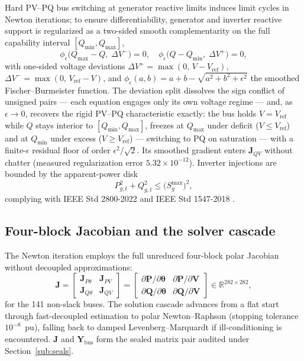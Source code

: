 Hard PV--PQ bus switching at generator reactive limits induces limit cycles in Newton iterations; to ensure differentiability, generator and inverter reactive support is regularized as a two-sided smooth complementarity on the full capability interval $[Q_{\min}, Q_{\max}]$,
\begin{equation}
\phi_\epsilon\bigl(Q_{\max} - Q,\; \Delta V^{-}\bigr) = 0, \quad
\phi_\epsilon\bigl(Q - Q_{\min},\; \Delta V^{+}\bigr) = 0,
\label{eq:qsgen}
\end{equation}
with one-sided voltage deviations $\Delta V^{+} = \max(0,\, V - V_{\mathrm{ref}})$, $\Delta V^{-} = \max(0,\, V_{\mathrm{ref}} - V)$, and $\phi_\epsilon(a, b) = a + b - \sqrt{a^2 + b^2 + \epsilon^2}$ the smoothed Fischer--Burmeister function. The deviation split dissolves the sign conflict of unsigned pairs --- each equation engages only its own voltage regime --- and, as $\epsilon \to 0$, recovers the rigid PV--PQ characteristic exactly: the bus holds $V = V_{\mathrm{ref}}$ while $Q$ stays interior to $[Q_{\min}, Q_{\max}]$, freezes at $Q_{\max}$ under deficit ($V \le V_{\mathrm{ref}}$) and at $Q_{\min}$ under excess ($V \ge V_{\mathrm{ref}}$) --- switching to PQ on saturation --- with a finite-$\epsilon$ residual floor of order $\epsilon^2/\sqrt{2}$. Its smoothed gradient enters $\mathbf{J}_{QV}$ without chatter (measured regularization error $5.32 \times 10^{-12}$). Inverter injections are bounded by the apparent-power disk
\begin{equation}
P_{g,t}^{2} + Q_{g,t}^{2} \le \bigl(S_{g}^{\max}\bigr)^{2},
\label{eq:capability}
\end{equation}
complying with IEEE Std 2800-2022 \cite{ieee2800} and IEEE Std 1547-2018 \cite{ieee1547}.

\subsection{Four-block Jacobian and the solver cascade}
\label{sub:jacobian}

The Newton iteration employs the full unreduced four-block polar Jacobian without decoupled approximations:
\begin{equation}
\mathbf{J} =
\begin{bmatrix}
\mathbf{J}_{P\theta} & \mathbf{J}_{PV} \\
\mathbf{J}_{Q\theta} & \mathbf{J}_{QV}
\end{bmatrix}
=
\begin{bmatrix}
\partial \mathbf{P} / \partial \boldsymbol{\theta} & \partial \mathbf{P} / \partial \mathbf{V} \\[3pt]
\partial \mathbf{Q} / \partial \boldsymbol{\theta} & \partial \mathbf{Q} / \partial \mathbf{V}
\end{bmatrix} \in \mathbb{R}^{282 \times 282},
\label{eq:polar_j}
\end{equation}
for the 141 non-slack buses. The solution cascade advances from a flat start through fast-decoupled estimation to polar Newton--Raphson (stopping tolerance $10^{-8}$~pu), falling back to damped Levenberg--Marquardt if ill-conditioning is encountered. $\mathbf{J}$ and $\mathbf{Y}_{\mathrm{bus}}$ form the sealed matrix pair audited under Section~\ref{sub:seals}.


